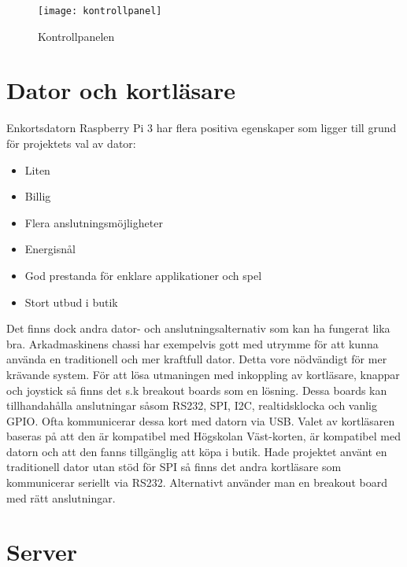 \documentclass[12pt,fleqn,openany]{book} %
\begin{document}
\begin{figure}[h]
\centering\texttt{[image: kontrollpanel]}
\caption{Kontrollpanelen}
\label{fig_kontrollpanel}
\end{figure}

\section{Dator och kortläsare}
Enkortsdatorn Raspberry Pi 3 har flera positiva egenskaper som ligger till grund för projektets val av dator:

\begin{itemize}
 \item Liten
 \item Billig
 \item Flera anslutningsmöjligheter
 \item Energisnål
 \item God prestanda för enklare applikationer och spel
 \item Stort utbud i butik
\end{itemize}
\bigskip

Det finns dock andra dator- och anslutningsalternativ som kan ha fungerat lika bra. Arkadmaskinens chassi har exempelvis gott med utrymme 
för att kunna använda en traditionell och mer kraftfull dator. Detta vore nödvändigt för mer krävande system. För att lösa utmaningen med 
inkoppling av kortläsare, knappar och joystick så finns det s.k breakout boards som en lösning. Dessa boards kan tillhandahålla anslutningar 
såsom RS232, SPI, I2C, realtidsklocka och vanlig GPIO. Ofta kommunicerar dessa kort med datorn via USB. Valet av kortläsaren baseras på att 
den är kompatibel med Högskolan Väst-korten, är kompatibel med datorn och att den fanns tillgänglig att köpa i butik. Hade projektet använt 
en traditionell dator utan stöd för SPI så finns det andra kortläsare som kommunicerar seriellt via RS232. Alternativt använder man en 
breakout board med rätt anslutningar.

\section{Server}
\end{document}
